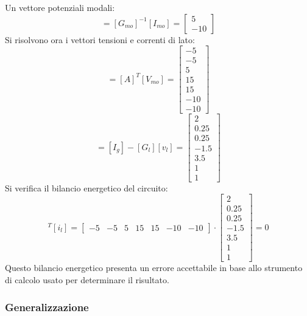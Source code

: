 \documentclass{article}
\numberwithin{equation}{subsection}
\begin{document}
Un vettore potenziali modali:
\begin{equation*}
    [V_{mo}]=[G_{mo}]^{-1}[I_{mo}]=\begin{bmatrix}
        5\\
        -10
    \end{bmatrix}
\end{equation*}
Si risolvono ora i vettori tensioni e correnti di lato:
\begin{equation*}
    [v_l]=[A]^T[V_{mo}]=\begin{bmatrix}
        -5\\
        -5\\
        5\\
        15\\
        15\\
        -10\\
        -10
    \end{bmatrix}
\end{equation*}
\begin{equation*}
    [i_l]=[I_g]-[G_l][v_l]=\begin{bmatrix}
        2\\
        0.25\\
        0.25\\
        -1.5\\
        3.5\\
        1\\
        1
    \end{bmatrix}
\end{equation*}
Si verifica il bilancio energetico del circuito:
\begin{equation*}
    [v_l]^T[i_l]=\begin{bmatrix}
        -5&
        -5&
        5&
        15&
        15&
        -10&
        -10
    \end{bmatrix}\cdot\begin{bmatrix}
        2\\
        0.25\\
        0.25\\
        -1.5\\
        3.5\\
        1\\
        1
    \end{bmatrix}
    =0
\end{equation*}
Questo bilancio energetico presenta un errore accettabile in base allo strumento di calcolo usato per determinare il risultato. 

\subsubsection{Generalizzazione}
\end{document}
